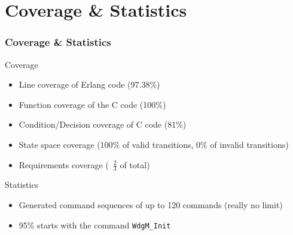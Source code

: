 \documentclass{beamer}
\begin{document}

\section{Coverage \& Statistics}

\begin{frame}[fragile]
  \frametitle{Coverage \& Statistics}
  \begin{block}{Coverage}
    \begin{itemize}
      \item Line coverage of Erlang code (97.38\%)
      \item Function coverage of the C code (100\%)
      \item Condition/Decision coverage of C code (81\%)
      \item State space coverage (100\% of valid transitions, 0\% of
        invalid transitions)
      \item Requirements coverage (~$\frac{2}{3}$ of total)
    \end{itemize}
  \end{block}
  \begin{block}{Statistics}
    \begin{itemize}
      \item Generated command sequences of up to 120 commands (really no limit)
      \item 95\% starts with the command \verb!WdgM_Init!
    \end{itemize}
  \end{block}
\end{frame}

\end{document}
